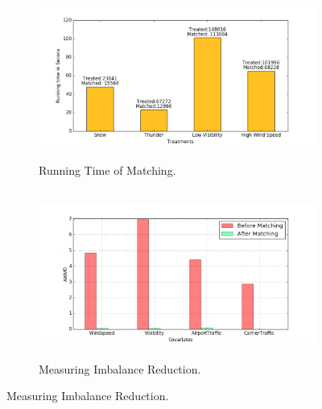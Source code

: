 \begin{figure}
\hspace*{-0.7cm}\begin{subfigure}{0.62\linewidth}
\centering
\includegraphics[height=5.5cm,width=\linewidth]{Figures/rtep1.png}
\caption{{Running Time of Matching.}}
\label{sfig:testa}
\end{subfigure}\hfill
\hspace*{-0.7cm}\begin{subfigure}{0.62\linewidth}
\centering
\includegraphics[height=5.5cm,width=\linewidth]{Figures/IR.png}
\caption{{Measuring Imbalance Reduction.}}
\label{sfig:testb}
\end{subfigure}\hfill


\end{figure}
